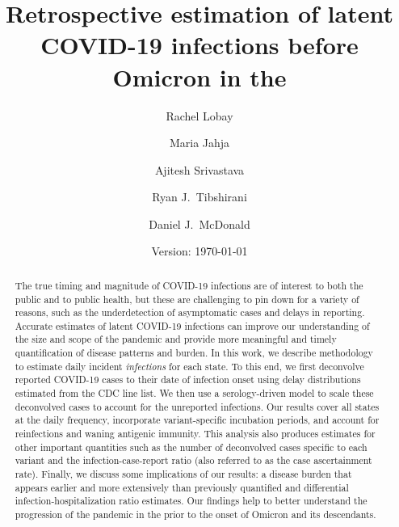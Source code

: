 \documentclass{article}
\begin{document}
\title{Retrospective estimation of latent COVID-19 infections before Omicron in the \US}
\author[a,1]{Rachel Lobay}
\author[b]{Maria Jahja}
\author[c]{Ajitesh Srivastava}
\author[d]{Ryan J.\ Tibshirani}
\author[a]{Daniel J.\ McDonald}





\date{Version: \today}
\maketitle

\begin{abstract}
The true timing and magnitude of COVID-19 infections are of interest to both the
public and to public health, but these are challenging to pin down for a variety
of reasons, such as the underdetection of asymptomatic cases and delays in
reporting. Accurate estimates of latent COVID-19 infections can improve our
understanding of the size and scope of the pandemic and provide more meaningful
and timely quantification of disease patterns and burden. In this work, we
describe methodology to estimate daily incident \emph{infections} for each \US
state. To this end, we first deconvolve reported COVID-19 cases to their date of
infection onset using delay distributions estimated from the CDC line list. We
then use a serology-driven model to scale these deconvolved cases to account for
the unreported infections. Our results cover all states at the daily frequency,
incorporate variant-specific incubation periods, and account for reinfections
and waning antigenic immunity. This analysis also produces estimates for other
important quantities such as the number of deconvolved cases specific to each
variant and the infection-case-report ratio (also referred to as the case
ascertainment rate). Finally, we discuss some implications of our results: a
disease burden that appears earlier and more extensively than previously
quantified and differential infection-hospitalization ratio estimates. Our
findings help to better understand the progression of the pandemic in the \US
prior to the onset of Omicron and its descendants. 

\end{abstract}
\end{document}
